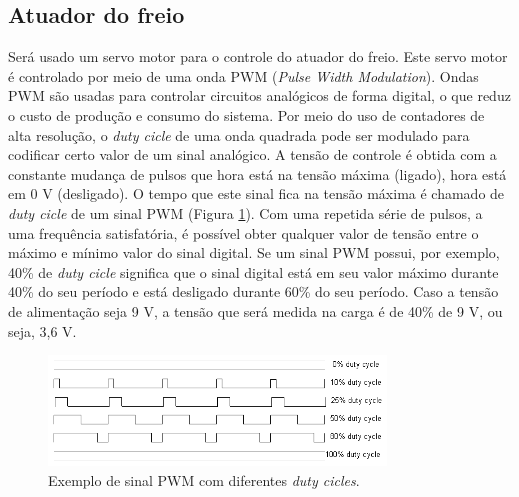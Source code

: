 

\subsection{Atuador do freio} %
\label{sub:atuador}

Será usado um servo motor para o controle do atuador do freio. Este servo motor é controlado por meio de uma onda PWM (\textit{Pulse Width Modulation}). Ondas PWM são usadas para controlar circuitos analógicos de forma digital, o que reduz o custo de produção e consumo do sistema. Por meio do uso de contadores de alta resolução, o \textit{duty cicle} de uma onda quadrada pode ser modulado para codificar certo valor de um sinal analógico. A tensão de controle é obtida com a constante mudança de pulsos que hora está na tensão máxima (ligado), hora está em 0 V (desligado). O tempo que este sinal fica na tensão máxima é chamado de \textit{duty cicle} de um sinal PWM (Figura \ref{fig:pwmcircuito}). Com uma repetida série de pulsos, a uma frequência satisfatória, é possível obter qualquer valor de tensão entre o máximo e mínimo valor do sinal digital.
Se um sinal PWM possui, por exemplo, 40\% de \textit{duty cicle} significa que o sinal digital está em seu valor máximo durante 40\% do seu período e está desligado durante 60\% do seu período. Caso a tensão de alimentação seja 9 V, a tensão que será medida na carga é de 40\% de 9 V, ou seja, 3,6 V.
\begin{figure}[h]
  \centering
	\includegraphics[width=0.8\textwidth]{figuras/pwmExample.png}
  \caption{Exemplo de sinal PWM com diferentes \textit{duty cicles}.}
  \label{fig:pwmcircuito}
\end{figure}


